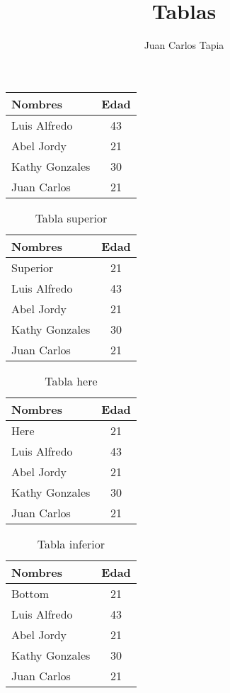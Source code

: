 \documentclass[11pt,a4paper]{article}
\author{Juan Carlos Tapia}
\title{Tablas}
\begin{document}
\maketitle
\begin{center}
\begin{tabular}{|l|c|}
\hline
Nombres & Edad \\ \hline
Luis Alfredo & 43 \\ \hline
Abel Jordy  & 21 \\ \hline
Kathy Gonzales & 30 \\ \hline
Juan Carlos & 21 \\ \hline
\end{tabular}
\end{center}




\begin{table}[t]
\begin{center}
\begin{tabular}{|l|c|}
\hline
Nombres & Edad \\ \hline
Superior & 21 \\ \hline
Luis Alfredo & 43 \\ \hline
Abel Jordy  & 21 \\ \hline
Kathy Gonzales & 30 \\ \hline
Juan Carlos & 21 \\ \hline
\end{tabular}
\caption{Tabla superior}
\end{center}
\end{table}

\begin{table}[h]
\begin{center}
\begin{tabular}{|l|c|}
\hline
Nombres & Edad \\ \hline
Here & 21 \\ \hline
Luis Alfredo & 43 \\ \hline
Abel Jordy  & 21 \\ \hline
Kathy Gonzales & 30 \\ \hline
Juan Carlos & 21 \\ \hline
\end{tabular}
\caption{Tabla here}
\end{center}
\end{table}


\begin{table}[b]
\begin{center}
\begin{tabular}{|l|c|}
\hline
Nombres & Edad \\ \hline
Bottom & 21 \\ \hline
Luis Alfredo & 43 \\ \hline
Abel Jordy  & 21 \\ \hline
Kathy Gonzales & 30 \\ \hline
Juan Carlos & 21 \\ \hline
\end{tabular}
\caption{Tabla inferior}
\end{center}
\end{table}
\end{document}
